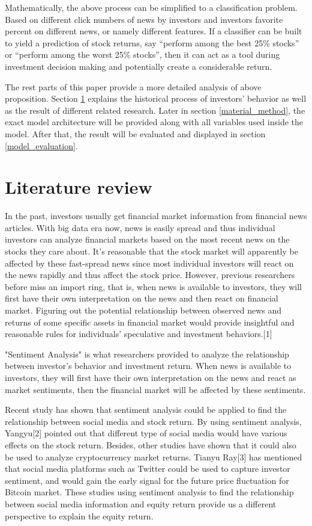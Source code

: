 \documentclass[letterpaper]{article}
\begin{document}
Mathematically, the above process can be simplified to a classification problem. Based on different click numbers of news by investors and investors favorite percent on different news, or namely different features. If a classifier can be built to yield a prediction of stock returns, say “perform among the best 25\% stocks” or “perform among the worst 25\% stocks”, then it can act as a tool during investment decision making and potentially create a considerable return.

The rest parts of this paper provide a more detailed analysis of above proposition. Section \ref{literature_review} explains the historical process of investors' behavior as well as the result of different related research. Later in section \ref{material_method}, the exact model architecture will be provided along with all variables used inside the model. After that, the result will be evaluated and displayed in section \ref{model_evaluation}.


\section{Literature review}
\label{literature_review}

In the past, investors usually get financial market information from financial news articles. With big data era now, news is easily spread and thus individual investors can analyze financial markets based on the most recent news on the stocks they care about. It’s reasonable that the stock market will apparently be affected by these fast-spread news since most individual investors will react on the news rapidly and thus affect the stock price. {\color{red} However, previous researchers before miss an import ring, that is, when news is available to investors, they will first have their own interpretation on the news and then react on financial market.} Figuring out the potential relationship between observed news and returns of some specific assets in financial market would provide insightful and reasonable rules for individuals’ speculative and investment behaviors.[1]

"Sentiment Analysis" is what researchers provided to analyze the relationship between investor’s behavior and investment return. When news is available to investors, they will first have their own interpretation on the news and react as market sentiments, then the financial market will be affected by these sentiments.

Recent study has shown that sentiment analysis could be applied to find the relationship between social media and stock return. By using sentiment analysis, Yangyu[2] pointed out that different type of social media would have various effects on the stock return. Besides, other studies have shown that it could also be used to analyze cryptocurrency market returns. Tianyu Ray[3] has mentioned that social media platforms such as Twitter could be used to capture investor sentiment, and would gain the early signal for the future price fluctuation for Bitcoin market. These studies using sentiment analysis to find the relationship between social media information and equity return provide us a different perspective to explain the equity return. 
\end{document}
